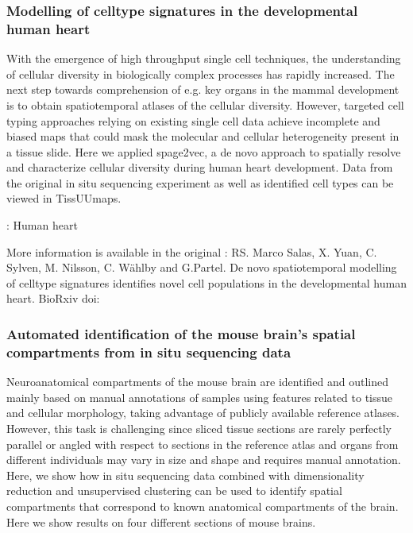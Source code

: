 \documentclass[letterpaper,10pt,english,openany,oneside]{sphinxmanual}
\begin{document}
\subsubsection{Modelling of cell\sphinxhyphen{}type signatures in the developmental human heart}
\label{\detokenize{docs/starting/projects:modelling-of-cell-type-signatures-in-the-developmental-human-heart}}
\sphinxAtStartPar
With the emergence of high throughput single cell techniques, the understanding of cellular diversity in biologically complex processes has rapidly increased. The next step towards comprehension of e.g. key organs in the mammal development is to obtain spatiotemporal atlases of the cellular diversity. However, targeted cell typing approaches relying on existing single cell data achieve incomplete and biased maps that could mask the molecular and cellular heterogeneity present in a tissue slide. Here we applied spage2vec, a de novo approach to spatially resolve and characterize cellular diversity during human heart development. Data from the original in situ sequencing experiment as well as identified cell types can be viewed in TissUUmaps.

\sphinxAtStartPar
{}

\sphinxAtStartPar
{}:
Human heart

\sphinxAtStartPar
More information is available in the original : RS. Marco Salas, X. Yuan,  C. Sylven,  M. Nilsson,  C. Wählby and  G.Partel. De novo spatiotemporal modelling of cell\sphinxhyphen{}type signatures identifies novel cell populations in the developmental human heart. BioRxiv doi: 


\subsubsection{Automated identification of the mouse brain’s spatial compartments from in situ sequencing data}
\label{\detokenize{docs/starting/projects:automated-identification-of-the-mouse-brain-s-spatial-compartments-from-in-situ-sequencing-data}}
\sphinxAtStartPar
Neuroanatomical compartments of the mouse brain are identified and outlined mainly based on manual annotations of samples using features related to tissue and cellular morphology, taking advantage of publicly available reference atlases. However, this task is challenging since sliced tissue sections are rarely perfectly parallel or angled with respect to sections in the reference atlas and organs from different individuals may vary in size and shape and requires manual annotation. Here, we show how in situ sequencing data combined with dimensionality reduction and unsupervised clustering can be used to identify spatial compartments that correspond to known anatomical compartments of the brain. Here we show results on four different sections of mouse brains.
\end{document}

